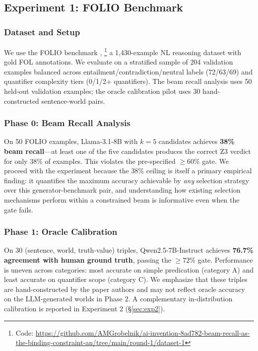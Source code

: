 \documentclass[11pt,letterpaper]{article}
\begin{document}
\subsection{Experiment 1: FOLIO Benchmark}

\subsubsection{Dataset and Setup}

We use the FOLIO benchmark \citep{Han2022},%
\footnote{Code: \url{https://github.com/AMGrobelnik/ai-invention-8ad782-beam-recall-as-the-binding-constraint-an/tree/main/round-1/dataset-1}}
a 1,430-example NL reasoning dataset with gold FOL annotations. We evaluate on a stratified sample of 204 validation examples balanced across entailment/contradiction/neutral labels (72/63/69) and quantifier complexity tiers (0/1/2+ quantifiers). The beam recall analysis uses 50 held-out validation examples; the oracle calibration pilot uses 30 hand-constructed sentence-world pairs.

\subsubsection{Phase 0: Beam Recall Analysis}

On 50 FOLIO examples, Llama-3.1-8B with $k{=}5$ candidates achieves \textbf{38\% beam recall}---at least one of the five candidates produces the correct Z3 verdict for only 38\% of examples. This violates the pre-specified $\geq 60\%$ gate. We proceed with the experiment because the 38\% ceiling is itself a primary empirical finding: it quantifies the maximum accuracy achievable by \emph{any} selection strategy over this generator-benchmark pair, and understanding how existing selection mechanisms perform within a constrained beam is informative even when the gate fails.

\subsubsection{Phase 1: Oracle Calibration}

On 30 (sentence, world, truth-value) triples, Qwen2.5-7B-Instruct achieves \textbf{76.7\% agreement with human ground truth}, passing the $\geq 72\%$ gate. Performance is uneven across categories: most accurate on simple predication (category A) and least accurate on quantifier scope (category C). We emphasize that these triples are hand-constructed by the paper authors and may not reflect oracle accuracy on the LLM-generated worlds in Phase 2. A complementary in-distribution calibration is reported in Experiment 2 (\S\ref{sec:exp2}).
\end{document}
